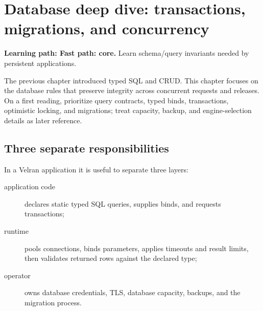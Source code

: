\chapter{Database deep dive: transactions, migrations, and concurrency}\label{ch:db-deep-dive}

\noindent\textbf{Learning path: Fast path: core.} Learn schema/query invariants needed by persistent applications.\par\medskip





The previous chapter introduced typed SQL and CRUD. This chapter focuses on the database rules that preserve integrity across concurrent requests and releases. On a first reading, prioritize query contracts, typed binds, transactions, optimistic locking, and migrations; treat capacity, backup, and engine-selection details as later reference.

\section{Three separate responsibilities}

In a Velran application it is useful to separate three layers:

\begin{description}
\item[application code] declares static typed SQL queries, supplies binds, and requests transactions;
\item[runtime] pools connections, binds parameters, applies timeouts and result limits, then validates returned rows against the declared type;
\item[operator] owns database credentials, TLS, database capacity, backups, and the migration process.
\end{description}

